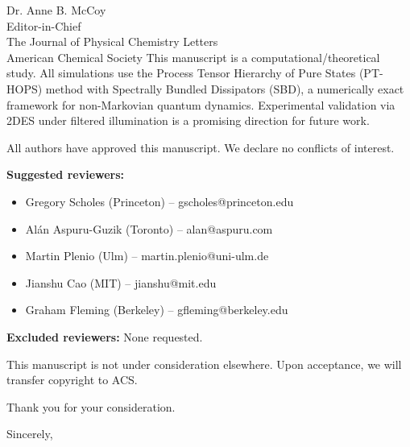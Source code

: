 \documentclass[11pt,a4paper]{letter}
\begin{document}
\begin{letter}{
Dr. Anne B. McCoy\\
Editor-in-Chief\\
The Journal of Physical Chemistry Letters\\
American Chemical Society
}
This manuscript is a computational/theoretical study. All simulations use the Process Tensor Hierarchy of Pure States (PT-HOPS) method with Spectrally Bundled Dissipators (SBD), a numerically exact framework for non-Markovian quantum dynamics. Experimental validation via 2DES under filtered illumination is a promising direction for future work.

All authors have approved this manuscript. We declare no conflicts of interest.

\textbf{Suggested reviewers:}
\begin{itemize}
\item Gregory Scholes (Princeton) -- gscholes@princeton.edu
\item Alán Aspuru-Guzik (Toronto) -- alan@aspuru.com
\item Martin Plenio (Ulm) -- martin.plenio@uni-ulm.de
\item Jianshu Cao (MIT) -- jianshu@mit.edu
\item Graham Fleming (Berkeley) -- gfleming@berkeley.edu
\end{itemize}

\textbf{Excluded reviewers:} None requested.

This manuscript is not under consideration elsewhere. Upon acceptance, we will transfer copyright to ACS.

Thank you for your consideration.

\closing{Sincerely,}


\end{letter}
\end{document}
